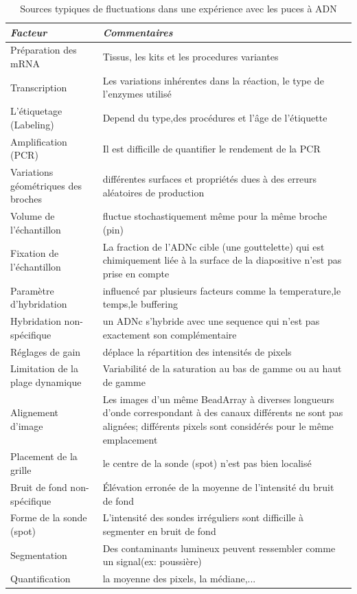 \documentclass[a4paper,10pt]{article}
\begin{document}
\begin{table}[!ht]
\centering
\begin{tabular}{|p{3cm}|p{9cm}|}
\hline
 \emph{Facteur} & \emph{Commentaires}\\
\hline
Préparation des mRNA  &  Tissus, les kits et les procedures variantes \\
\hline 
Transcription & Les variations inhérentes dans la réaction, le type de l'enzymes utilisé  \\
\hline 
L'étiquetage (Labeling) & Depend du type,des procédures et l'âge de l'étiquette  \\
\hline
Amplification (PCR) & Il est difficille de quantifier le rendement de la PCR\\
\hline
Variations géométriques des broches & différentes surfaces et propriétés dues à des erreurs aléatoires de production \\
\hline
Volume de l'échantillon & fluctue stochastiquement même pour la même broche (pin)  \\
\hline
Fixation de l'échantillon & La fraction de l'ADNc cible (une gouttelette) qui est chimiquement liée à la surface de la diapositive n'est pas prise en compte \\
\hline
 Paramètre d'hybridation &  influencé par plusieurs facteurs comme la temperature,le temps,le buffering \\
\hline
 Hybridation non-spécifique & un ADNc s'hybride avec une sequence qui n'est pas exactement son complémentaire \\
\hline
Réglages de gain & déplace la répartition des intensités de pixels \\
\hline
Limitation de la plage dynamique & Variabilité de la saturation au bas de gamme ou au haut de gamme \\
\hline
Alignement d'image & Les images d'un même BeadArray à diverses longueurs d'onde correspondant à des canaux différents ne sont pas alignées; différents pixels sont considérés pour le même emplacement \\
\hline
 Placement de la grille & le centre de la sonde (spot) n’est pas bien localisé  \\
\hline
 Bruit de fond non-spécifique& Élévation erronée de la moyenne de l'intensité du bruit de fond \\
\hline
Forme de la sonde (spot) & L'intensité des sondes irréguliers sont difficille à segmenter en bruit de fond \\
\hline
 Segmentation & Des contaminants lumineux peuvent ressembler comme un signal(ex: poussière) \\
\hline
 Quantification & la moyenne des pixels, la médiane,... \\
\hline
\end{tabular}
\caption{Sources typiques de fluctuations dans une expérience avec les puces à ADN}
\label{Sources de variation}
\end{table}
\end{document}
